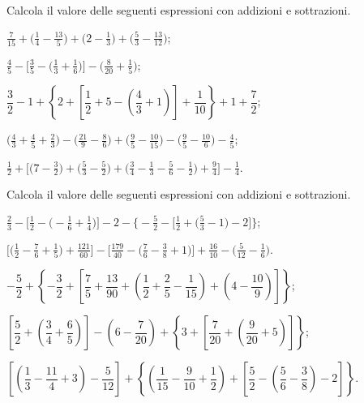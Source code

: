 \begin{esercizio}[\Ast]
 \label{ese:3.130}
 Calcola il valore delle seguenti espressioni con addizioni e sottrazioni.
\begin{enumeratea}
\spazielenx
\item $\displaystyle{\frac{7}{15}+\bigg(\frac{1}{4}-\frac{13}{5}\bigg)+\bigg(2-\frac{1}{3}\bigg)+\bigg(\frac{5}{3}-\frac{13}{12}\bigg)}$;
\item $\displaystyle{\frac{4}{5}-\bigg[\frac{3}{5}-\bigg(\frac{1}{3}+\frac{1}{6}\bigg)\bigg]-\bigg(\frac{8}{20}+\frac{1}{5}\bigg)}$;
\item $ \dfrac{3}{2}-1+\left\lbrace 2+\left[\dfrac{1}{2}+5-\left(\dfrac{4}{3}+1 \right)  \right]+\dfrac{1}{10} \right\rbrace+1+\dfrac{7}{2}$;
\item $\displaystyle{\bigg(\frac{4}{3}+\frac{4}{5}+\frac{2}{3}\bigg)-\bigg(\frac{21}{9}-\frac{8}{6}\bigg)+\bigg(\frac{9}{5}-\frac{10}{15}\bigg)-\bigg(\frac{9}{5}-\frac{10}{6}\bigg)-\frac{4}{5}}$;
\item $\displaystyle{\frac{1}{2}+\bigg[\bigg(7-\frac{3}{2}\bigg)+\bigg(\frac{5}{3}-\frac{5}{2}\bigg)+\bigg(\frac{3}{4}-\frac{1}{3}-\frac{5}{6}-\frac{1}{2}\bigg)+\frac{9}{4}\bigg]-\frac{1}{4}}$.
\end{enumeratea}
\end{esercizio}
\pagebreak
\begin{esercizio}[\Ast]
 \label{ese:3.131}
 Calcola il valore delle seguenti espressioni con addizioni e sottrazioni.
\begin{enumeratea}
\spazielenx
\item $\displaystyle{\frac{2}{3}-\bigg[\frac{1}{2}-\bigg(-\frac{1}{6}+\frac{1}{4}\bigg)\bigg]-2-\bigg\{-\frac{5}{2}-\bigg[\frac{1}{2}+\bigg(\frac{5}{3}-1\bigg)-2\bigg]\bigg\}}$;
\item $\displaystyle{\bigg[\bigg(\frac{1}{2}-\frac{7}{6}+\frac{1}{5}\bigg)+\frac{121}{60}\bigg]-\bigg[\frac{179}{40}-\bigg(\frac{7}{6}-\frac{3}{8}+1\bigg)\bigg]+\frac{16}{10}-\bigg(\frac{5}{12}-\frac{1}{6}\bigg)}$.
\item $-\dfrac{5}{2}+\left\lbrace -\dfrac{3}{2}+\left[\dfrac{7}{5}+\dfrac{13}{90}+\left(\dfrac{1}{2}+\dfrac{2}{5}-\dfrac{1}{15}\right)+\left(4-\dfrac{10}{9}\right)\right]\right\rbrace $;
\item $\left[\dfrac{5}{2}+\left(\dfrac{3}{4}+\dfrac{6}{5}\right)\right]-\left(6-\dfrac{7}{20} \right)+\left\lbrace3+\left[\dfrac{7}{20}+\left(\dfrac{9}{20}+5\right)\right]\right\rbrace$;
\item $\left[\left(\dfrac{1}{3}-\dfrac{11}{4}+3\right)-\dfrac{5}{12}\right]+\left\lbrace\left(\dfrac{1}{15}-\dfrac{9}{10}+\dfrac{1}{2} \right)+\left[\dfrac{5}{2}-\left(\dfrac{5}{6}-\dfrac{3}{8}\right)-2\right]\right\rbrace$.
\end{enumeratea}
\end{esercizio}

